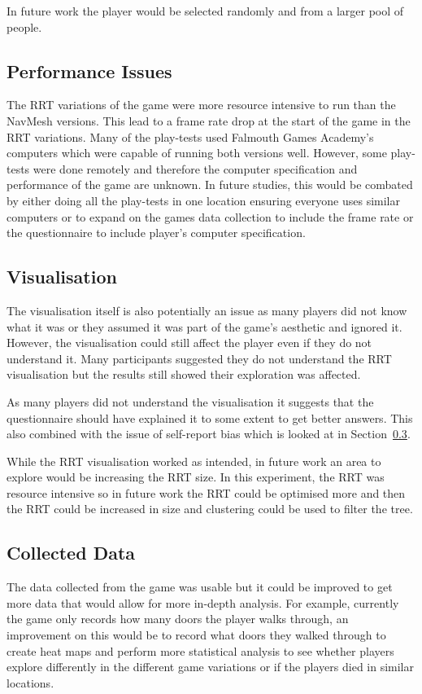 \documentclass[journal]{IEEEtran}
\begin{document}
	In future work the player would be selected randomly and from a larger pool of people.
	
	\subsection{Performance Issues}
	The RRT variations of the game were more resource intensive to run than the NavMesh versions. This lead to a frame rate drop at the start of the game in the RRT variations. 
	Many of the play-tests used Falmouth Games Academy's computers which were capable of running both versions well. However, some play-tests were done remotely and therefore the computer specification and performance of the game are unknown. In future studies, this would be combated by either doing all the play-tests in one location ensuring everyone uses similar computers or to expand on the games data collection to include the frame rate or the questionnaire to include player's computer specification.     
	
	\subsection{Visualisation}    
	The visualisation itself is also potentially an issue as many players did not know what it was or they assumed it was part of the game's aesthetic and ignored it. However, the visualisation could still affect the player even if they do not understand it.  Many participants suggested they do not understand the RRT visualisation but the results still showed their exploration was affected. 
	
	As many players did not understand the visualisation it suggests that the questionnaire should have explained it to some extent to get better answers. This also combined with the issue of self-report bias which is looked at in Section~\ref{CData}. 
	
	While the RRT visualisation worked as intended, in future work an area to explore would be increasing the RRT size.  In this experiment, the RRT was resource intensive so in future work the RRT could be optimised more and then the RRT could be increased in size and clustering could be used to filter the tree.
	
	\subsection{Collected Data}    \label{CData}
	The data collected from the game was usable but it could be improved to get more data that would allow for more in-depth analysis. For example, currently the game only records how many doors the player walks through, an improvement on this would be to record what doors they walked through to create heat maps and perform more statistical analysis to see whether players explore differently in the different game variations or if the players died in similar locations.
	
\end{document}
